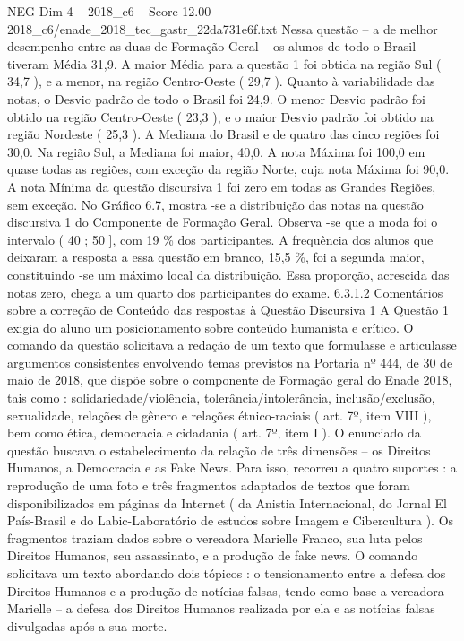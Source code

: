 \begin{textsample}{NEG Dim 4 – 2018\_c6 – Score 12.00 – 2018\_c6/enade\_2018\_tec\_gastr\_22da731e6f.txt}
Nessa questão – a de melhor desempenho entre as duas de Formação Geral – os alunos de todo o Brasil tiveram Média 31,9.
A maior Média para a questão 1 foi obtida na região Sul ( 34,7 ), e a menor, na região Centro-Oeste ( 29,7 ).
Quanto à variabilidade das notas, o Desvio padrão de todo o Brasil foi 24,9.
O menor Desvio padrão foi obtido na região Centro-Oeste ( 23,3 ), e o maior Desvio padrão foi obtido na região Nordeste ( 25,3 ).
A Mediana do Brasil e de quatro das cinco regiões foi 30,0.
Na região Sul, a Mediana foi maior, 40,0.
A nota Máxima foi 100,0 em quase todas as regiões, com exceção da região Norte, cuja nota Máxima foi 90,0.
A nota Mínima da questão discursiva 1 foi zero em todas as Grandes Regiões, sem exceção.
No Gráfico 6.7, mostra -se a distribuição das notas na questão discursiva 1 do Componente de Formação Geral.
Observa -se que a moda foi o intervalo ( 40 ; 50 ], com 19 \% dos participantes.
A frequência dos alunos que deixaram a resposta a essa questão em branco, 15,5 \%, foi a segunda maior, constituindo -se um máximo local da distribuição.
Essa proporção, acrescida das notas zero, chega a um quarto dos participantes do exame. 6.3.1.2 Comentários sobre a correção de Conteúdo das respostas à Questão Discursiva 1 A Questão 1 exigia do aluno um posicionamento sobre conteúdo humanista e crítico.
O comando da questão solicitava a redação de um texto que formulasse e articulasse argumentos consistentes envolvendo temas previstos na Portaria nº 444, de 30 de maio de 2018, que dispõe sobre o componente de Formação geral do Enade 2018, tais como : solidariedade/violência, tolerância/intolerância, inclusão/exclusão, sexualidade, relações de gênero e relações étnico-raciais ( art. 7º, item VIII ), bem como ética, democracia e cidadania ( art. 7º, item I ).
O enunciado da questão buscava o estabelecimento da relação de três dimensões – os Direitos Humanos, a Democracia e as Fake News.
Para isso, recorreu a quatro suportes : a reprodução de uma foto e três fragmentos adaptados de textos que foram disponibilizados em páginas da Internet ( da Anistia Internacional, do Jornal El País-Brasil e do Labic-Laboratório de estudos sobre Imagem e Cibercultura ).
Os fragmentos traziam dados sobre o vereadora Marielle Franco, sua luta pelos Direitos Humanos, seu assassinato, e a produção de fake news.
O comando solicitava um texto abordando dois tópicos : o tensionamento entre a defesa dos Direitos Humanos e a produção de notícias falsas, tendo como base a vereadora Marielle – a defesa dos Direitos Humanos realizada por ela e as notícias falsas divulgadas após a sua morte.

\end{textsample}
